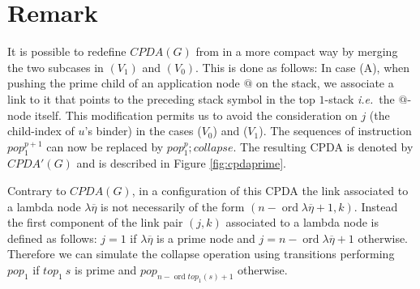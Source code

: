 \documentclass{article}
\newcommand{\ord}{\mathop{\mathrm{ord}}}
\theoremstyle{remark}
\theoremstyle{definition}
\def\ie{{\it i.e.}\ }
\begin{document}
\section{Remark}
It is possible to redefine $CPDA(G)$ from
\cite{hague-sto07} in a more compact way by merging the two subcases in
$(V_1)$ and $(V_0)$. This is done as follows: In case (A), when
pushing the prime child of an application node $@$ on the stack, we
associate a link to it that points to the preceding stack symbol in
the top $1$-stack \ie the $@$-node itself.
 This modification permits us to avoid the consideration on $j$ (the child-index of $u$'s binder) in the
 cases ($V_0$) and ($V_1$). The sequences of instruction $pop_1^{p+1}$ can now be replaced by
 $pop_1^p ; collapse$. The resulting CPDA is denoted by $CPDA'(G)$ and is described in
Figure \ref{fig:cpdaprime}.
\begin{figure}[htbp]
\begin{center}
\end{center}
\end{figure}
Contrary to $CPDA(G)$, in a configuration of this CPDA the link associated to a lambda node $\lambda\overline\eta$ is not necessarily of the form
$(n-\ord{\lambda\overline\eta}+1,k)$. Instead the first component of the link pair $(j,k)$ associated to a lambda node is defined as follows:
$j = 1$ if $\lambda\overline\eta$ is a prime node and $j=n-\ord{\lambda\overline\eta}+1$ otherwise. Therefore we can simulate the collapse operation 
using transitions performing $pop_1$ if $top_1~s$ is prime and $pop_{n-\ord{top_1(s)}+1}$ otherwise.
\clearpage



\end{document}
